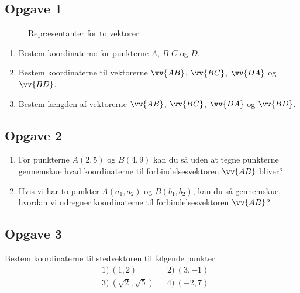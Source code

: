 \subsection*{Opgave 1}
	\begin{figure}[H]
		\centering
		\caption{Repræsentanter for to vektorer}
		\label{fig:tovektorer}
	\end{figure}
\begin{enumerate}[label = \roman*)]
	\item Bestem koordinaterne for punkterne $A$, $B$ $C$ og $D$.
	\item Bestem koordinaterne til vektorerne $\vv{AB}$, $\vv{BC}$, $\vv{DA}$ og $\vv{BD}$.
	\item Bestem længden af vektorerne $\vv{AB}$, $\vv{BC}$, $\vv{DA}$ og $\vv{BD}$.
\end{enumerate}

\subsection*{Opgave 2}
\begin{enumerate}[label = \roman*)]
	\item For punkterne $A(2,5)$ og $B(4,9)$ kan du så uden at tegne punkterne gennemskue hvad
	koordinaterne til forbindelsesvektoren $\vv{AB}$ bliver?
	\item Hvis vi har to punkter $A(a_1,a_2)$ og $B(b_1,b_2)$, kan du så gennemskue, hvordan vi
	udregner koordinaterne til forbindelsesvektoren $\vv{AB}$?
\end{enumerate}


\subsection*{Opgave 3}

Bestem koordinaterne til stedvektoren til følgende punkter 
\begin{align*}
&1) \ (1,2)   &&2) \  (3,-1)  \\
&3) \  (\sqrt{2},\sqrt{5})  &&4) \ (-2,7)    \\
\end{align*}


